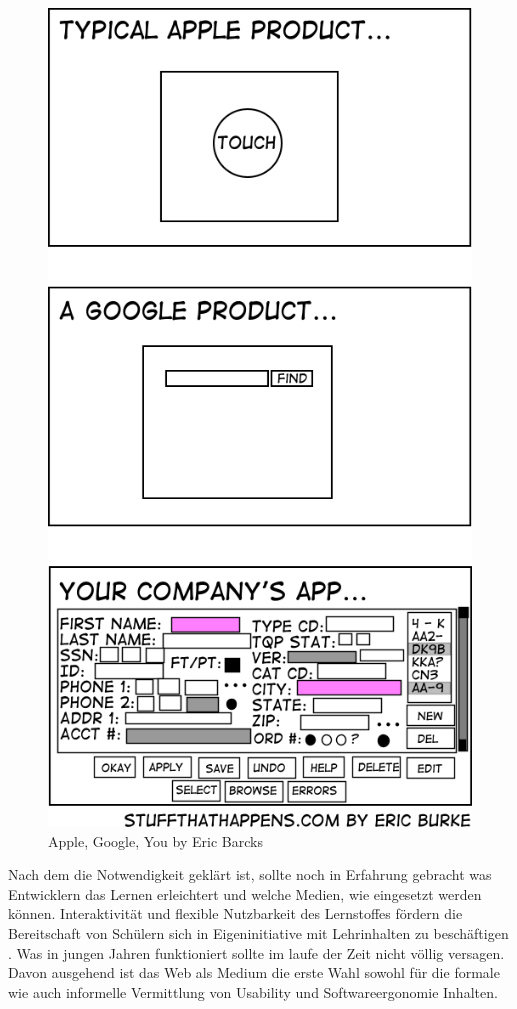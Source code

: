 \documentclass[a4paper, 12pt, twoside, BCOR=20mm, DIV=calc, abstracton, parskip=half*, toc=bibliography, toc=listof, headsepline, footsepline, headings=small, numbers=enddot]{scrreprt}
\begin{document}
	\begin{figure}[h!]
		\centering
		\includegraphics[scale=0.7]{Bild/Usability_Comic.jpg}
		\caption{Apple, Google, You by Eric Barcks}
	\end{figure}
	Nach dem die Notwendigkeit geklärt ist, sollte noch in Erfahrung gebracht was Entwicklern das Lernen erleichtert und welche Medien, wie eingesetzt werden können. 
	Interaktivität und flexible Nutzbarkeit des Lernstoffes fördern die Bereitschaft von Schülern sich in  Eigeninitiative mit Lehrinhalten zu beschäftigen \cite[S.32 ff.]{beck2000eigenstandiges}. Was in jungen Jahren funktioniert sollte im laufe der Zeit nicht völlig versagen. Davon ausgehend ist das Web als Medium die erste Wahl sowohl für die formale wie auch informelle Vermittlung von Usability und Softwareergonomie Inhalten. 
	
\end{document}
